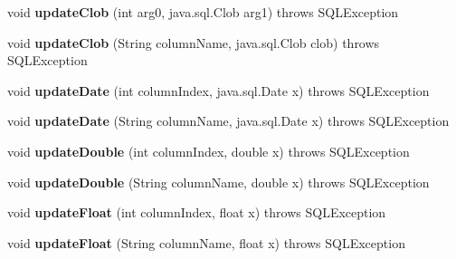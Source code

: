 \begin{DoxyCompactItemize}
void {\bfseries update\+Clob} (int arg0, java.\+sql.\+Clob arg1)  throws S\+Q\+L\+Exception 
\item 
\mbox{\label{classcom_1_1mysql_1_1cj_1_1jdbc_1_1result_1_1_result_set_impl_ab1756d8c9fb110288e8bf6e44f2f9564}} 
void {\bfseries update\+Clob} (String column\+Name, java.\+sql.\+Clob clob)  throws S\+Q\+L\+Exception 
\item 
\mbox{\label{classcom_1_1mysql_1_1cj_1_1jdbc_1_1result_1_1_result_set_impl_acb874242a77cf3dbba2c0835da174f87}} 
void {\bfseries update\+Date} (int column\+Index, java.\+sql.\+Date x)  throws S\+Q\+L\+Exception 
\item 
\mbox{\label{classcom_1_1mysql_1_1cj_1_1jdbc_1_1result_1_1_result_set_impl_afc4fe09de9b86151ab985f3970906773}} 
void {\bfseries update\+Date} (String column\+Name, java.\+sql.\+Date x)  throws S\+Q\+L\+Exception 
\item 
\mbox{\label{classcom_1_1mysql_1_1cj_1_1jdbc_1_1result_1_1_result_set_impl_a7dbd79b44b951e557ca9324d09dd4132}} 
void {\bfseries update\+Double} (int column\+Index, double x)  throws S\+Q\+L\+Exception 
\item 
\mbox{\label{classcom_1_1mysql_1_1cj_1_1jdbc_1_1result_1_1_result_set_impl_a3533766fe417d76a41578814596d7348}} 
void {\bfseries update\+Double} (String column\+Name, double x)  throws S\+Q\+L\+Exception 
\item 
\mbox{\label{classcom_1_1mysql_1_1cj_1_1jdbc_1_1result_1_1_result_set_impl_a87ff914a334e0cf8b198f9ff52569a7e}} 
void {\bfseries update\+Float} (int column\+Index, float x)  throws S\+Q\+L\+Exception 
\item 
\mbox{\label{classcom_1_1mysql_1_1cj_1_1jdbc_1_1result_1_1_result_set_impl_a5b92f4eaf7fa00b5676b2e9291820649}} 
void {\bfseries update\+Float} (String column\+Name, float x)  throws S\+Q\+L\+Exception 

\end{DoxyCompactItemize}
